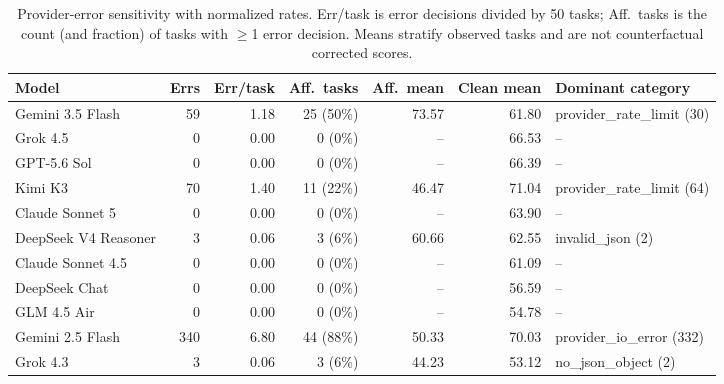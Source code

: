 \begin{table}[t]
\caption{Provider-error sensitivity with normalized rates. Err/task is error decisions divided by 50 tasks; Aff.\ tasks is the count (and fraction) of tasks with $\geq$1 error decision. Means stratify observed tasks and are not counterfactual corrected scores.}
\label{tab:errors}
\centering\scriptsize
\begin{tabular}{lrrrrrl}
\toprule
Model & Errs & Err/task & Aff.\ tasks & Aff.\ mean & Clean mean & Dominant category \\
\midrule
Gemini 3.5 Flash & 59 & 1.18 & 25 (50\%) & 73.57 & 61.80 & provider\_rate\_limit (30) \\
Grok 4.5 & 0 & 0.00 & 0 (0\%) & -- & 66.53 & -- \\
GPT-5.6 Sol & 0 & 0.00 & 0 (0\%) & -- & 66.39 & -- \\
Kimi K3 & 70 & 1.40 & 11 (22\%) & 46.47 & 71.04 & provider\_rate\_limit (64) \\
Claude Sonnet 5 & 0 & 0.00 & 0 (0\%) & -- & 63.90 & -- \\
DeepSeek V4 Reasoner & 3 & 0.06 & 3 (6\%) & 60.66 & 62.55 & invalid\_json (2) \\
Claude Sonnet 4.5 & 0 & 0.00 & 0 (0\%) & -- & 61.09 & -- \\
DeepSeek Chat & 0 & 0.00 & 0 (0\%) & -- & 56.59 & -- \\
GLM 4.5 Air & 0 & 0.00 & 0 (0\%) & -- & 54.78 & -- \\
Gemini 2.5 Flash & 340 & 6.80 & 44 (88\%) & 50.33 & 70.03 & provider\_io\_error (332) \\
Grok 4.3 & 3 & 0.06 & 3 (6\%) & 44.23 & 53.12 & no\_json\_object (2) \\
\bottomrule
\end{tabular}
\end{table}
